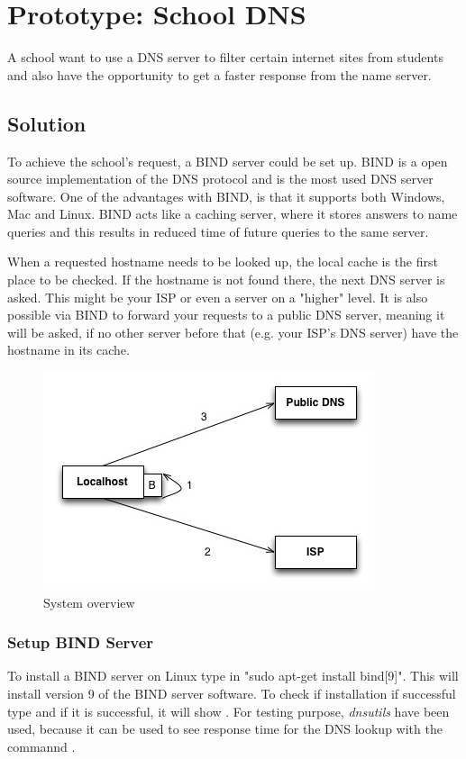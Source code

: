 \documentclass[Preamble]{subfiles}
\begin{document}
\chapter{Prototype: School DNS}
A school want to use a DNS server to filter certain internet sites from students and also have the opportunity to get a faster response from the name server. 

\section{Solution}
To achieve the school's request, a BIND server could be set up. 
BIND is a open source implementation of the DNS protocol and is the most used DNS server software. 
One of the advantages with BIND, is that it supports both Windows, Mac and Linux. 
BIND acts like a caching server, where it stores answers to name queries and this results in reduced time of future queries to the same server.

When a requested hostname needs to be looked up, the local cache is the first place to be checked. 
If the hostname is not found there, the next DNS server is asked. 
This might be your ISP or even a server on a "higher" level. 
It is also possible via BIND to forward your requests to a public DNS server, meaning it will be asked, if no other server before that (e.g. your ISP's DNS server) have the hostname in its cache. 

\begin{figure}[hbtp]
\centering
\includegraphics[scale=0.5]{../../Protoypes/DNS/ForwardingDiagram.jpg}
\caption{System overview}
\label{fig:Forwarding}
\end{figure}


\subsection{Setup BIND Server}
To install a BIND server on Linux type in "sudo apt-get install bind[9]". This will install version 9 of the BIND server software. To check if installation if successful type  and if it is successful, it will show . 
For testing purpose, \textit{dnsutils} have been used, because it can be used to see response time for the DNS lookup with the commannd .
\end{document}
